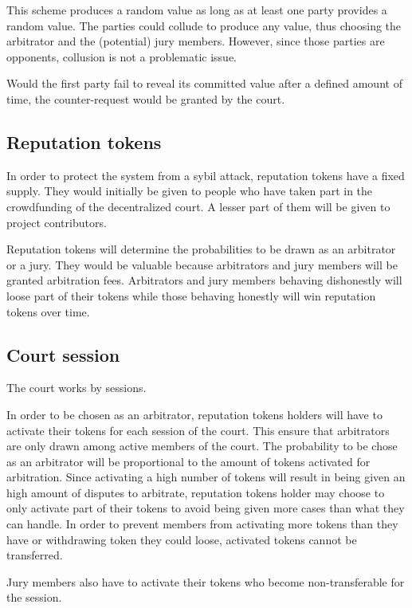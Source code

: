 \documentclass[12 pt]{article}
\begin{document}
This scheme produces a random value as long as at least one party provides a random value. The parties could collude to produce any value, thus choosing the arbitrator and the (potential) jury members. However, since those parties are opponents, collusion is not a problematic issue.

Would the first party fail to reveal its committed value after a defined amount of time, the counter-request would be granted by the court.

\subsection{Reputation tokens}
In order to protect the system from a sybil attack\cite{sybil}, reputation tokens have a fixed supply. They would initially be given to people who have taken part in the crowdfunding of the decentralized court. A lesser part of them will be given to project contributors.

Reputation tokens will determine the probabilities to be drawn as an arbitrator or a jury. They would be valuable because arbitrators and jury members will be granted arbitration fees.
Arbitrators and jury members behaving dishonestly will loose part of their tokens while those behaving honestly will win reputation tokens over time.

\subsection{Court session}

The court works by sessions.

In order to be chosen as an arbitrator, reputation tokens holders will have to activate their tokens for each session of the court. This ensure that arbitrators are only drawn among active members of the court. The probability to be chose as an arbitrator will be proportional to the amount of tokens activated for arbitration. Since activating a high number of tokens will result in being given an high amount of disputes to arbitrate, reputation tokens holder may choose to only activate part of their tokens to avoid being given more cases than what they can handle.
In order to prevent members from activating more tokens than they have or withdrawing token they could loose, activated tokens cannot be transferred.

Jury members also have to activate their tokens who become non-transferable for the session.
\end{document}
